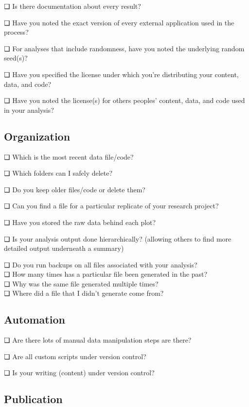 \documentclass[
]{book}
\begin{document}
❏ Is there documentation about every result?

❏ Have you noted the exact version of every external application used in the process?

❏ For analyses that include randomness, have you noted the underlying random seed(s)?

❏ Have you specified the license under which you're distributing your content, data, and code?

❏ Have you noted the license(s) for others peoples' content, data, and code used in your analysis?

\hypertarget{organization}{%
\subsection{Organization}\label{organization}}

❏ Which is the most recent data file/code?

❏ Which folders can I safely delete?

❏ Do you keep older files/code or delete them?

❏ Can you find a file for a particular replicate of your research project?

❏ Have you stored the raw data behind each plot?

❏ Is your analysis output done hierarchically? (allowing others to find more detailed output underneath a summary)

❏ Do you run backups on all files associated with your analysis?\\
❏ How many times has a particular file been generated in the past?\\
❏ Why was the same file generated multiple times?\\
❏ Where did a file that I didn't generate come from?

\hypertarget{automation}{%
\subsection{Automation}\label{automation}}

❏ Are there lots of manual data manipulation steps are there?

❏ Are all custom scripts under version control?

❏ Is your writing (content) under version control?

\hypertarget{publication}{%
\subsection{Publication}\label{publication}}
\end{document}
